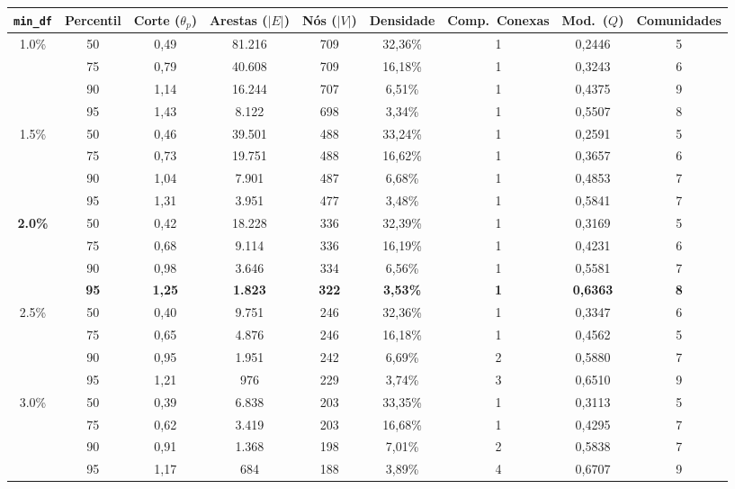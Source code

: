 \begin{tabular}{ccccccccc}
\toprule
\textbf{\texttt{min\_df}} & \textbf{Percentil} & \textbf{Corte ($\theta_p$)} & \textbf{Arestas ($|E|$)} & \textbf{Nós ($|V|$)} & \textbf{Densidade} & \textbf{Comp.\ Conexas} & \textbf{Mod.\ ($Q$)} & \textbf{Comunidades} \\
\midrule
\multirow{4}{*}{1.0\%} & 50 & 0,49 & 81.216 & 709 & 32,36\% & 1 & 0,2446 & 5 \\
 & 75 & 0,79 & 40.608 & 709 & 16,18\% & 1 & 0,3243 & 6 \\
 & 90 & 1,14 & 16.244 & 707 & 6,51\% & 1 & 0,4375 & 9 \\
 & 95 & 1,43 & 8.122 & 698 & 3,34\% & 1 & 0,5507 & 8 \\
\midrule
\multirow{4}{*}{1.5\%} & 50 & 0,46 & 39.501 & 488 & 33,24\% & 1 & 0,2591 & 5 \\
 & 75 & 0,73 & 19.751 & 488 & 16,62\% & 1 & 0,3657 & 6 \\
 & 90 & 1,04 & 7.901 & 487 & 6,68\% & 1 & 0,4853 & 7 \\
 & 95 & 1,31 & 3.951 & 477 & 3,48\% & 1 & 0,5841 & 7 \\
\midrule
\multirow{4}{*}{\textbf{2.0\%}} & 50 & 0,42 & 18.228 & 336 & 32,39\% & 1 & 0,3169 & 5 \\
 & 75 & 0,68 & 9.114 & 336 & 16,19\% & 1 & 0,4231 & 6 \\
 & 90 & 0,98 & 3.646 & 334 & 6,56\% & 1 & 0,5581 & 7 \\
 & \textbf{95} & \textbf{1,25} & \textbf{1.823} & \textbf{322} & \textbf{3,53\%} & \textbf{1} & \textbf{0,6363} & \textbf{8} \\
\midrule
\multirow{4}{*}{2.5\%} & 50 & 0,40 & 9.751 & 246 & 32,36\% & 1 & 0,3347 & 6 \\
 & 75 & 0,65 & 4.876 & 246 & 16,18\% & 1 & 0,4562 & 5 \\
 & 90 & 0,95 & 1.951 & 242 & 6,69\% & 2 & 0,5880 & 7 \\
 & 95 & 1,21 & 976 & 229 & 3,74\% & 3 & 0,6510 & 9 \\
\midrule
\multirow{4}{*}{3.0\%} & 50 & 0,39 & 6.838 & 203 & 33,35\% & 1 & 0,3113 & 5 \\
 & 75 & 0,62 & 3.419 & 203 & 16,68\% & 1 & 0,4295 & 7 \\
 & 90 & 0,91 & 1.368 & 198 & 7,01\% & 2 & 0,5838 & 7 \\
 & 95 & 1,17 & 684 & 188 & 3,89\% & 4 & 0,6707 & 9 \\
\bottomrule
\end{tabular}
